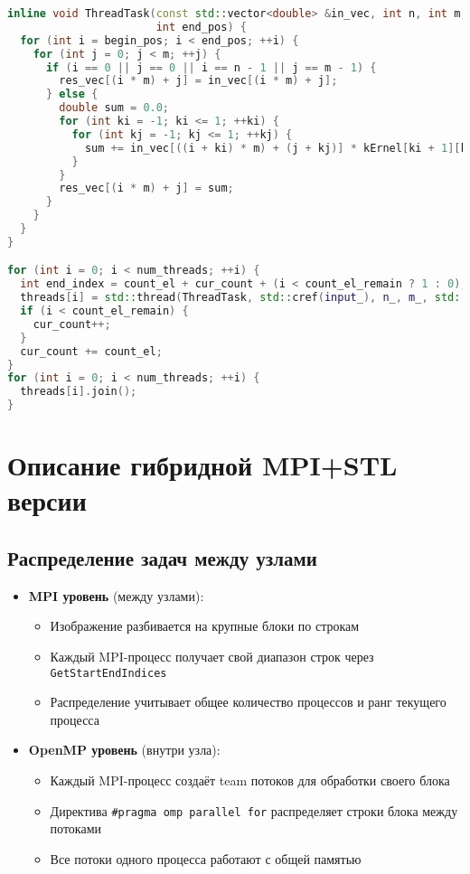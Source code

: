 \documentclass[a4paper,12pt]{article}
\begin{document}
\begin{lstlisting}[language=C++, caption=Фрагмент STL-реализации]
inline void ThreadTask(const std::vector<double> &in_vec, int n, int m, std::vector<double> &res_vec, int begin_pos,
                       int end_pos) {
  for (int i = begin_pos; i < end_pos; ++i) {
    for (int j = 0; j < m; ++j) {
      if (i == 0 || j == 0 || i == n - 1 || j == m - 1) {
        res_vec[(i * m) + j] = in_vec[(i * m) + j];
      } else {
        double sum = 0.0;
        for (int ki = -1; ki <= 1; ++ki) {
          for (int kj = -1; kj <= 1; ++kj) {
            sum += in_vec[((i + ki) * m) + (j + kj)] * kErnel[ki + 1][kj + 1];
          }
        }
        res_vec[(i * m) + j] = sum;
      }
    }
  }
}

for (int i = 0; i < num_threads; ++i) {
  int end_index = count_el + cur_count + (i < count_el_remain ? 1 : 0);
  threads[i] = std::thread(ThreadTask, std::cref(input_), n_, m_, std::ref(res_), cur_count, end_index);
  if (i < count_el_remain) {
    cur_count++;
  }
  cur_count += count_el;
}
for (int i = 0; i < num_threads; ++i) {
  threads[i].join();
}
\end{lstlisting}

\section{Описание гибридной MPI+STL версии}


\subsection*{Распределение задач между узлами}
\begin{itemize}
\item \textbf{MPI уровень} (между узлами):
\begin{itemize}
\item Изображение разбивается на крупные блоки по строкам
\item Каждый MPI-процесс получает свой диапазон строк через \texttt{GetStartEndIndices}
\item Распределение учитывает общее количество процессов и ранг текущего процесса
\end{itemize}

\item \textbf{OpenMP уровень} (внутри узла):
\begin{itemize}
\item Каждый MPI-процесс создаёт team потоков для обработки своего блока
\item Директива \texttt{\#pragma omp parallel for} распределяет строки блока между потоками
\item Все потоки одного процесса работают с общей памятью
\end{itemize}
\end{itemize}
\end{document}

